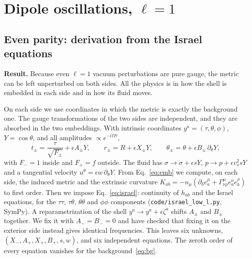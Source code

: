 \documentclass[10.5pt,a4paper]{article}
\newcommand{\idea}[1]{\par\smallskip\noindent\colorbox{idea!8}{\parbox{\dimexpr\linewidth-2\fboxsep}{\small\textbf{\color{idea}Result.} #1}}\par\smallskip}
\begin{document}
\section{Dipole oscillations, $\ell=1$}
\subsection{Even parity: derivation from the Israel equations}
\idea{Because even $\ell=1$ vacuum perturbations are pure gauge, the metric can be left unperturbed on both sides. All
the physics is in how the shell is embedded in each side and in how its fluid moves.}

On each side we use coordinates in which the metric is exactly the background one. The gauge transformations of the two
sides are independent, and they are absorbed in the two embeddings. With intrinsic coordinates $y^a=(\tau,\theta,\phi)$,
$Y=\cos\theta$, and all amplitudes $\propto e^{-i\Omega\tau}$,
\begin{equation}
t_\pm=\frac{\tau}{\sqrt{F_\pm}}+\epsilon A_\pm Y,\qquad r_\pm=R+\epsilon X_\pm Y,\qquad
\theta_\pm=\theta+\epsilon B_\pm\,\partial_\theta Y,
\label{eq:emb}
\end{equation}
with $F_-=1$ inside and $F_+=f$ outside. The fluid has $\sigma\to\sigma+\epsilon sY$, $p\to p+\epsilon v_s^2sY$ and a
tangential velocity $u^\theta=\epsilon w\,\partial_\theta Y$. From Eq.~\eqref{eq:emb} we compute, on each side, the
induced metric and the extrinsic curvature
$K_{ab}=-n_\mu(\partial_be^\mu_a+\Gamma^\mu_{\nu\rho}e^\nu_ae^\rho_b)$ to first order. Then we impose
Eq.~\eqref{eq:israel}: continuity of $h_{ab}$ and the Israel equations, for the $\tau\tau$, $\tau\theta$,
$\theta\theta$ and $\phi\phi$ components (\texttt{code/israel\_low\_l.py}, SymPy). A reparametrization of the shell
$y^a\to y^a+\epsilon\zeta^a$ shifts $A_\pm$ and $B_\pm$ together. We fix it with $A_-=B_-=0$ and have checked that
fixing it on the exterior side instead gives identical frequencies. This leaves six unknowns,
$(X_-,A_+,X_+,B_+,s,w)$, and six independent equations. The zeroth order of every equation vanishes for the
background~\eqref{eq:bg}.
\end{document}
